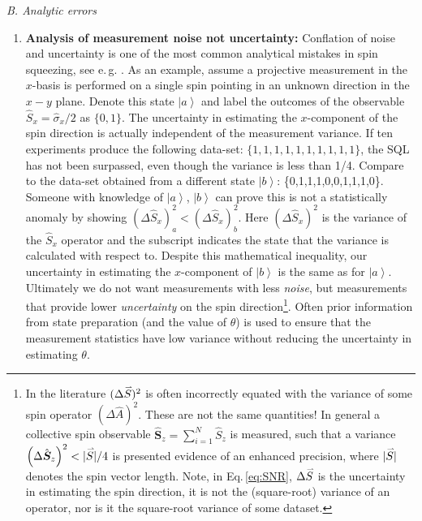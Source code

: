 \documentclass[reqno]{amsart}
\newcommand{\ket}[1]{\left| #1 \right>}
\newcommand{\myvec}[1]{\accentset{\rightharpoonup}{#1}}
\begin{document}
\noindent\textit{B. Analytic errors}
\begin{enumerate}
\item \textbf{Analysis of measurement noise not uncertainty:} Conflation of noise and uncertainty is one of the most common analytical mistakes in spin squeezing, see e.\,g. \cite{Orzel2001, Esteve2008, Appel2009, Gross2010, Koschorreck2010, Koschorreck2010a, Leroux2010, LouchetChauvet2010, Riedel2010, SchleierSmith2010, Sewell2012, Cox2016, Hosten2016, Kruse2016, Colombo2022, Greve2022, Malia2022, Franke2023}. As an example, assume a projective measurement in the $x$-basis is performed on a single spin pointing in an unknown direction in the $x-y$ plane. Denote this state $\ket{a}$ and label the outcomes of the observable $\hat{S}_x = \hat{\sigma}_x/2$ as $\{0, 1\}$. The uncertainty in estimating the $x$-component of the spin direction is actually independent of the measurement variance. If ten experiments produce the following data-set: $\{1,1,1,1,1,1,1,1,1,1\}$, the SQL has not been surpassed, even though the variance is less than 1/4. Compare to the data-set obtained from a different state $\ket{b}$: \{0,1,1,1,0,0,1,1,1,0\}. Someone with knowledge of $\ket{a}$, $\ket{b}$ can prove this is not a statistically anomaly by showing $\left(\Delta \hat{S}_x\right)^2_a < \left(\Delta \hat{S}_x\right)^2_b$. Here $\left(\Delta \hat{S}_x\right)^2$ is the variance of the $\hat{S}_x$ operator and  the subscript indicates the state that the variance is calculated with respect to. Despite this mathematical inequality, our uncertainty in estimating the $x$-component of $\ket{b}$ is the same as for $\ket{a}$. Ultimately we do not want measurements with less \emph{noise}, but measurements that provide lower \emph{uncertainty} on the spin direction\footnote{In the literature $(\Delta \myvec{S})^2$ is often incorrectly equated with the variance of some spin operator $(\Delta \hat{A})^2$. These are not the same quantities! In general a collective spin observable $\hat{\bm{S}}_z = \sum_{i=1}^N \hat{S}_z$ is measured, such that a variance $\left(\Delta \hat{\bm{S}}_z\right)^2 <|\myvec{S}|/4$ is presented evidence of an enhanced precision, where $|\myvec{S}|$ denotes the spin vector length. Note, in Eq.\,\eqref{eq:SNR}, $\Delta \myvec{S}$ is the uncertainty in estimating the spin direction, it is not the (square-root) variance of an operator, nor is it the square-root variance of some dataset.}. Often prior information from state preparation (and the value of $\theta$) is used to ensure that the measurement statistics have low variance without reducing the uncertainty in estimating $\theta$.


\end{enumerate}
\end{document}

